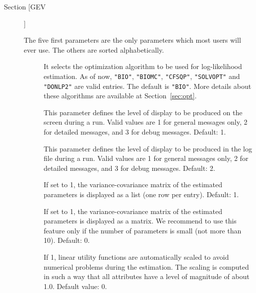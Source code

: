 \documentclass[12pt]{memoir}
\begin{document}
\begin{description}

  \item[Section [GEV]]

    The five first parameters are the only parameters  which most
    users will ever use. The others are sorted alphabetically. 
   
   \begin{description} 
      \item[]  It selects the optimization algorithm
         to be used for log-likelihood estimation. As of now,
         \verb+"BIO"+,
         \verb+"BIOMC"+,
         \verb+"CFSQP"+,
         \verb+"SOLVOPT"+ and
         \verb+"DONLP2"+ are valid entries.  
         The default is \verb+"BIO"+. 
         More details about these algorithms are available at 
         Section~\ref{sec:opt}.

      \item[] This parameter defines the level of display to be 
         produced on the screen during a run. Valid values are 1 for general messages only, 2 for 
         detailed messages, and 3 for debug messages. Default: 1. 
        
      \item[] This parameter defines the level of display to be 
         produced in the log file during a run. Valid values are 1 for general messages only, 2 
         for detailed messages, and 3 for debug messages. Default: 2. 

\item[] If set to 1, the
  variance-covariance matrix of the estimated parameters is displayed
  as a list (one row per entry). Default: 1.

\item[] If set to 1, the
  variance-covariance matrix of the estimated parameters is displayed
  as a matrix. We recommend to use this feature only if the number of
  parameters is small (not more than 10). Default: 0.

      \item[] If 1, linear utility functions are automatically scaled to avoid numerical problems during the estimation. The scaling is computed in such a way that all attributes have a level of magnitude of about 1.0. 
         Default value: 0.


\end{description}
\end{description}
\end{document}
